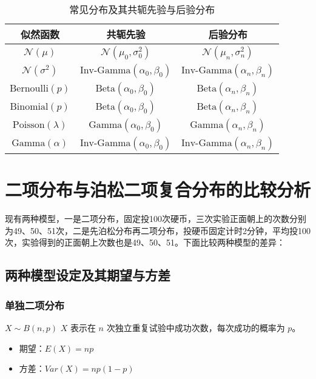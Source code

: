 \documentclass{article}
\begin{document}
\begin{table}[H]
    \centering
    \begin{tabular}{ccc}
        \toprule
        似然函数 & 共轭先验 & 后验分布 \\
        \midrule
        $\mathcal{N}(\mu)$ & $\mathcal{N}(\mu_0, \sigma^2_0)$ & $\mathcal{N}(\mu_n, \sigma^2_n)$ \\
        $\mathcal{N}(\sigma^2)$ & $\text{Inv-Gamma}(\alpha_0, \beta_0)$ & $\text{Inv-Gamma}(\alpha_n, \beta_n)$ \\
        $\text{Bernoulli}(p)$ & $\text{Beta}(\alpha_0, \beta_0)$ & $\text{Beta}(\alpha_n, \beta_n)$ \\
        $\text{Binomial}(p)$ & $\text{Beta}(\alpha_0, \beta_0)$ & $\text{Beta}(\alpha_n, \beta_n)$ \\
        $\text{Poisson}(\lambda)$ & $\text{Gamma}(\alpha_0, \beta_0)$ & $\text{Gamma}(\alpha_n, \beta_n)$ \\
        $\text{Gamma}(\alpha)$ & $\text{Inv-Gamma}(\alpha_0, \beta_0)$ & $\text{Inv-Gamma}(\alpha_n, \beta_n)$ \\
        \bottomrule
    \end{tabular}
    \caption{常见分布及其共轭先验与后验分布}
    \label{tab:conjugate_priors}
\end{table}



\section{二项分布与泊松二项复合分布的比较分析}
现有两种模型，一是二项分布，固定投100次硬币，三次实验正面朝上的次数分别为49、50、51次，二是先泊松分布再二项分布，投硬币固定计时2分钟，平均投100次，实验得到的正面朝上次数也是49、50、51。下面比较两种模型的差异：
\subsection{两种模型设定及其期望与方差}
    \subsubsection{单独二项分布}  $ X \sim B(n, p) $ $ X $ 表示在 $ n $ 次独立重复试验中成功次数，每次成功的概率为 $ p $。
    \begin{itemize}
        \item 期望：$E(X) = np$
        \item 方差：$Var(X) = np(1-p)$
    \end{itemize}
\end{document}
